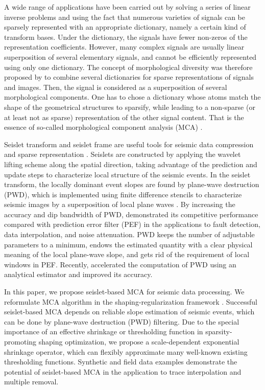 A wide range of applications have been carried out by solving a series of linear inverse problems and using the fact that numerous varieties of signals can be sparsely represented with an appropriate dictionary, namely a certain kind of transform bases. Under the dictionary, the signals have fewer non-zeros of the representation coefficients. However, many complex signals are usually linear superposition of several elementary signals, and cannot be efficiently represented using only one dictionary. The concept of morphological diversity was therefore proposed by \cite{starck2004redundant,starck2005image} to combine several dictionaries for sparse representations of signals and images. Then, the signal is considered as a superposition of several morphological components. One has to chose a dictionary whose atoms match the shape of the geometrical structures to sparsify, while leading to a non-sparse (or at least not as sparse) representation of the other signal content. That is the essence of so-called morphological component analysis (MCA) \citep{starck2004redundant,starck2007undecimated,woiselle20113}.

Seislet transform and seislet frame are useful tools for seismic data compression and sparse representation \citep{fomel2010seislet}. Seislets are constructed by applying the wavelet lifting scheme \citep{sweldens1998lifting} along the spatial direction, taking advantage of the prediction and update steps to characterize local structure of the seismic events.
In the seislet transform, the locally dominant event slopes are found by plane-wave destruction (PWD), which is implemented using finite difference stencils to characterize seismic images by a superposition of local plane waves \citep{claerbout1992earth}. By increasing the accuracy and dip bandwidth of PWD, \cite{fomel2002applications} demonstrated its competitive performance compared with prediction error filter (PEF) in the applications to fault detection, data interpolation, and noise attenuation. PWD keeps the number of adjustable parameters to a minimum, endows the estimated quantity with a clear physical meaning of the local plane-wave slope, and gets rid of the requirement of local windows in PEF. Recently, \cite{chen2013accelerated,chen2013omnidirectional} accelerated the computation of PWD using an analytical estimator and improved its accuracy.


In this paper, we propose seislet-based MCA for seismic data processing. We reformulate MCA algorithm in the shaping-regularization framework \citep{fomel2007shaping,fomel2008nonlinear}. Successful seislet-based MCA depends on reliable slope estimation of seismic events, which can be done by plane-wave destruction (PWD) filtering. Due to the special importance of an effective shrinkage or thresholding function in sparsity-promoting shaping optimization, we propose a scale-dependent exponential shrinkage operator, which can flexibly  approximate many well-known existing thresholding functions. Synthetic and field data examples demonstrate the potential of seislet-based MCA in the application to trace interpolation and multiple removal.

